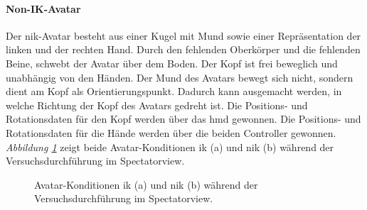 \documentclass[a4paper,11pt]{article}%
\renewcommand{\\}{\vspace*{0.5\baselineskip} \newline}
\begin{document}
		\paragraph{Non-IK-Avatar}
Der \ac{nik}-Avatar besteht aus einer Kugel mit Mund sowie einer Repräsentation der linken und der rechten Hand. Durch den fehlenden Oberkörper und die fehlenden Beine, schwebt der Avatar über dem Boden. Der Kopf ist frei beweglich und unabhängig von den Händen. Der Mund des Avatars bewegt sich nicht, sondern dient am Kopf als Orientierungspunkt. Dadurch kann ausgemacht werden, in welche Richtung der Kopf des Avatars gedreht ist. Die Positions- und Rotationsdaten für den Kopf werden über das \ac{hmd} gewonnen. Die Positions- und Rotationsdaten für die Hände werden über die beiden Controller gewonnen.\\
\textit{Abbildung \ref{AvatareImEinsatz}} zeigt beide Avatar-Konditionen \ac{ik} (a) und \ac{nik} (b) während der Versuchsdurchführung im Spectatorview.
\newpage

\begin{figure}[h]
  \centering
  \qquad
  \caption[Die Avatare und der Spectatorview]{Avatar-Konditionen \ac{ik} (a) und \ac{nik} (b) während der Versuchsdurchführung im Spectatorview.}
  \label{AvatareImEinsatz}
\end{figure}
\end{document}
